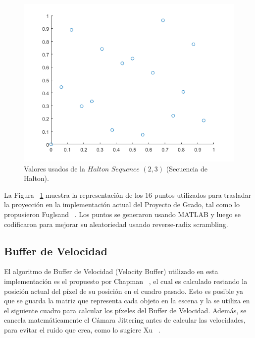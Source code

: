 \documentclass[pregrado]{tesis-usb} %
\begin{document}
\begin{figure}[!hbt]
	\centering
	\includegraphics[scale=0.5]{images/halton_16.png}
	\caption{Valores usados de la $Halton$ $Sequence$ $(2,3)$ (Secuencia de Halton).}\label{fig:halton16}
\end{figure}

La Figura ~\ref{fig:halton16} muestra la representación de los 16 puntos utilizados para trasladar la proyección en la implementación actual del Proyecto de Grado, tal como lo propusieron Fuglsand ~\cite{Fuglsand2016}. Los puntos se generaron usando MATLAB y luego se codificaron para mejorar su aleatoriedad usando reverse-radix scrambling.

\subsection{Buffer de Velocidad}
El algoritmo de Buffer de Velocidad (Velocity Buffer) utilizado en esta implementación es el propuesto por Chapman ~\cite{Chapman2012}, el cual es calculado restando la posición actual del píxel de su posición en el cuadro pasado. Esto es posible ya que se guarda la matriz que representa cada objeto en la escena y la se utiliza en el siguiente cuadro para calcular los píxeles del Buffer de Velocidad. Además, se cancela matemáticamente el Cámara Jittering antes de calcular las velocidades, para evitar el ruido que crea, como lo sugiere Xu ~\cite{XU2016}. 
\end{document}
